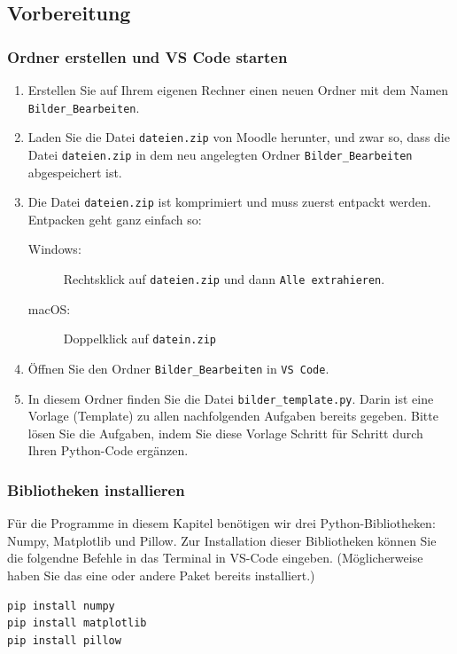 \subsection{Vorbereitung}
\subsubsection*{Ordner erstellen und VS Code starten}
\begin{enumerate}
	\item Erstellen Sie auf Ihrem eigenen Rechner einen neuen Ordner  mit dem Namen \texttt{Bilder\_Bearbeiten}.
	\item Laden Sie die Datei \texttt{dateien.zip} von Moodle herunter, und zwar so, dass die Datei \texttt{dateien.zip} in dem neu angelegten Ordner \texttt{Bilder\_Bearbeiten} abgespeichert ist.
	\item Die Datei \texttt{dateien.zip} ist komprimiert und muss zuerst entpackt werden. Entpacken geht ganz einfach so:
	      \begin{description}
		      \item[Windows:] Rechtsklick auf \texttt{dateien.zip} und dann \texttt{Alle extrahieren}.
		      \item[macOS:] Doppelklick auf \texttt{datein.zip}
	      \end{description}
	\item Öffnen Sie den Ordner \texttt{Bilder\_Bearbeiten} in \texttt{VS Code}.
	\item In diesem Ordner finden Sie die Datei \texttt{bilder\_template.py}. Darin ist eine Vorlage (Template) zu allen nachfolgenden Aufgaben bereits gegeben. Bitte lösen Sie die Aufgaben, indem Sie diese Vorlage Schritt für Schritt durch Ihren Python-Code ergänzen.
\end{enumerate}

\subsubsection*{Bibliotheken installieren}
Für die Programme in diesem Kapitel benötigen wir drei Python-Bibliotheken: Numpy, Matplotlib und Pillow. Zur Installation dieser Bibliotheken können Sie die folgendne Befehle in das Terminal in VS-Code eingeben. (Möglicherweise haben Sie das eine oder andere Paket bereits installiert.)
\begin{lstlisting}[language=bash]
pip install numpy
pip install matplotlib
pip install pillow
\end{lstlisting}



